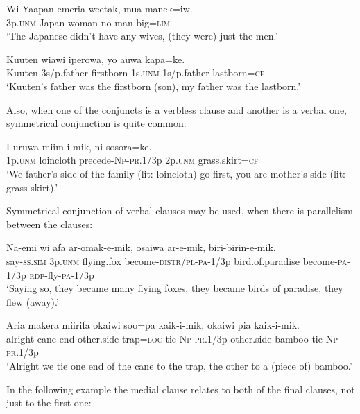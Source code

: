 \ea%
\label{ex:8:x1367}
\gll Wi  Yaapan  emeria  weetak,  mua  manek=iw. \\
3p.\textsc{unm}  Japan  woman  no  man  big=\textsc{lim}\\
\glt `The Japanese didn't have any wives, (they were) just the men.'
\z


\ea%
\label{ex:8:x1390}
\gll Kuuten  wiawi  iperowa,  yo  auwa  kapa=ke. \\
Kuuten  3s/p.father  firstborn  1s.\textsc{unm}  1s/p.father  lastborn=\textsc{cf}      \\
\glt `Kuuten's father was the firstborn (son), my father was the lastborn.'
\z




Also, when one of the conjuncts is a verbless clause and another is a verbal one, symmetrical conjunction is quite common:

\ea%
\label{ex:8:x1391}
\gll I  uruwa  miim-i-mik,  ni  sosora=ke.\\
1p.\textsc{unm}  loincloth  precede-\textsc{Np}-\textsc{pr}.1/3p  2p.\textsc{unm}  grass.skirt=\textsc{cf}\\
\glt `We father's side of the family (lit: loincloth) go first, you are mother's side (lit: grass skirt).'
\z




Symmetrical conjunction of verbal clauses may be used, when there is parallelism between the clauses:

\ea%
\label{ex:8:x1368}
\gll Na-emi  wi  afa  ar-omak-e-mik, osaiwa  ar-e-mik,  biri-birin-e-mik.\\
say-\textsc{ss}.\textsc{sim}  3p.\textsc{unm}  flying.fox  become-\textsc{distr}/\textsc{pl}-\textsc{pa}-1/3p bird.of.paradise  become-\textsc{pa}-1/3p  \textsc{rdp}-fly-\textsc{pa}-1/3p\\
\glt `Saying so, they became many flying foxes, they became birds of paradise, they flew (away).'
\z

\ea%
\label{ex:8:x1392}
\gll Aria  makera  miirifa  okaiwi  soo=pa  kaik-i-mik, okaiwi  pia  kaik-i-mik.\\
alright  cane  end  other.side  trap=\textsc{loc}  tie-\textsc{Np}-\textsc{pr}.1/3p other.side  bamboo  tie-\textsc{Np}-\textsc{pr}.1/3p\\
\glt `Alright we tie one end of the cane to the trap, the other to a (piece of) bamboo.'
\z

In the following example the medial clause relates to both of the final clauses, not just to the first one:

